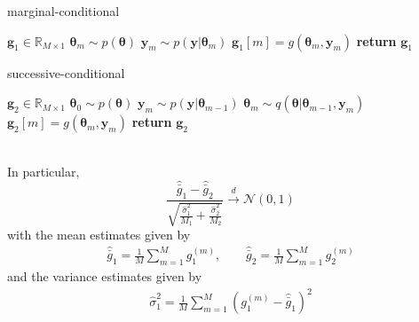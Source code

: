 \documentclass{article}
\begin{document}
\begin{minipage}{0.46\textwidth}
\begin{algorithm}[H]
    \centering
    \caption{marginal-conditional}\label{alg:mc-sampler}
    \begin{algorithmic}[1]
        \State {} $\mathbf{g}_{1} \in \mathbb{R}_{M\times 1}$
            \State $\mathbf{\theta}_{m} \sim p(\mathbf{\theta})$ 
            \State $\mathbf{y}_{m} \sim p(\mathbf{y}|\mathbf{\theta}_{m})$ 
            \State $\mathbf{g}_{1}[m] = g(\mathbf{\theta}_{m}, \mathbf{y}_{m})$ 
        \EndFor        
        \State \textbf{return} $\mathbf{g}_{1}$
    \end{algorithmic}
\end{algorithm}
\end{minipage}
\hfill
\begin{minipage}{0.46\textwidth}
\begin{algorithm}[H]
    \centering
    \caption{successive-conditional}\label{alg:sc-sampler}
    \begin{algorithmic}[1]
        \State {} $\mathbf{g}_{2} \in \mathbb{R}_{M\times 1}$
        \State $\mathbf{\theta}_{0} \sim p(\mathbf{\theta})$ 
            \State $\mathbf{y}_{m} \sim p(\mathbf{y}|\mathbf{\theta}_{m-1})$ 
            \State $\mathbf{\theta}_{m} \sim q(\mathbf{\theta}|\mathbf{\theta}_{m-1}, \mathbf{y}_{m})$ 
            \State $\mathbf{g}_{2}[m] = g(\mathbf{\theta}_{m}, \mathbf{y}_{m})$ 
        \EndFor        
        \State \textbf{return} $\mathbf{g}_{2}$
    \end{algorithmic}
\end{algorithm}
\end{minipage}
\\
In particular, 
\begin{equation}
    \frac{\hat{\bar{g}}_{1} - \hat{\bar{g}}_{2}}{\sqrt{ \frac{\hat{\sigma}^{2}_{1}}{M_{1}} + \frac{\hat{\sigma}^{2}_{2}}{M_{2}}}} \xrightarrow[]{d} \mathcal{N}(0, 1)
\end{equation}
with the mean estimates given by
\begin{align*}
    \hat{\bar{g}}_{1} = \frac{1}{M}\sum_{m=1}^{M}g_{1}^{(m)}, \qquad \hat{\bar{g}}_{2} = \frac{1}{M}\sum_{m=1}^{M}g_{2}^{(m)}
\end{align*}
and the variance estimates given by
\begin{align*}
    \hat{\sigma}_{1}^{2} = \frac{1}{M}\sum_{m=1}^{M}(g_{1}^{(m)} - \hat{\bar{g}}_{1})^{2}
\end{align*}
\end{document}
